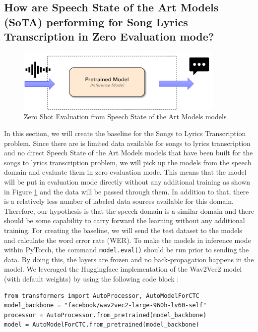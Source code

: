 \subsection{How are Speech State of the Art Models (SoTA) performing for Song Lyrics Transcription in Zero Evaluation mode?}

    \begin{figure} [H]
    \centering
    \includegraphics[width=0.9\textwidth]{05-research study/figures/zeroshot.pdf}
    \caption{Zero Shot Evaluation from Speech State of the Art Models  models}
    \label{fig:zeroshot}
\end{figure}

In this section, we will create the baseline for the Songs to Lyrics Transcription problem. Since there are is limited data available for songs to lyrics transcription and no direct Speech State of the Art Models  models that have been built for the songs to lyrics transcription problem, we will pick up the models from the speech domain and evaluate them in zero evaluation mode. This means that the model will be put in evaluation mode directly without any additional training as shown in Figure \ref{fig:zeroshot} and the data will be passed through them. In addition to that, there is a relatively less number of labeled data sources available for this domain. Therefore, our hypothesis is that the speech domain is a similar domain and there should be some capability to carry forward the learning without any additional training. For creating the baseline, we will send the test dataset to the models and calculate the word error rate (WER). To make the models in inference mode within PyTorch, the command \texttt{model.eval()} should be run prior to sending the data. By doing this, the layers are frozen and no back-propagation happens in the model. We leveraged the Huggingface implementation of the Wav2Vec2 model (with default weights) by using the following code block : \\
\begin{verbatim}
from transformers import AutoProcessor, AutoModelForCTC
model_backbone = "facebook/wav2vec2-large-960h-lv60-self"
processor = AutoProcessor.from_pretrained(model_backbone)
model = AutoModelForCTC.from_pretrained(model_backbone)
\end{verbatim}

